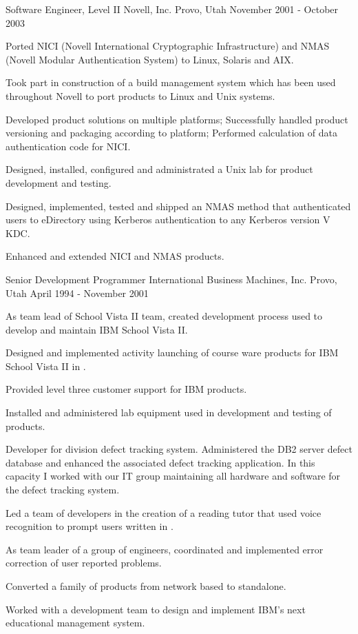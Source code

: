\cventry
{Software Engineer, Level II} %
{Novell, Inc.} %
{Provo, Utah} %
{November 2001 - October 2003} %
{
	\begin{cvitems} %
		\item {Ported NICI (Novell International Cryptographic Infrastructure) and NMAS (Novell Modular Authentication System) to Linux, Solaris and AIX.}
		\item {Took part in construction of a build management system which has been used throughout Novell to port products to Linux and Unix systems.}
		\item {Developed product solutions on multiple platforms; Successfully handled product versioning and packaging according to platform; Performed calculation of data authentication code for NICI.}
		\item {Designed, installed, configured and administrated a Unix lab for product development and testing.}
		\item {Designed, implemented, tested and shipped an NMAS method that authenticated users to eDirectory using Kerberos authentication to any Kerberos version V KDC.}
		\item {Enhanced and extended NICI and NMAS products.}
	\end{cvitems}
}

\cventry
{Senior Development Programmer} %
{International Business Machines, Inc.} %
{Provo, Utah} %
{April 1994 - November 2001} %
{
	\begin{cvitems} %
		\item {As team lead of School Vista II team, created development process used to develop and maintain IBM School Vista II.}
		\item {Designed and implemented activity launching of course ware products for IBM School Vista II in \Cpp{}.}
		\item {Provided level three customer support for IBM products.}
		\item {Installed and administered lab equipment used in development and testing of products.}
		\item {Developer for division defect tracking system. Administered the DB2 server defect database and enhanced the associated defect tracking application. In this capacity I worked with our IT group maintaining all hardware and software for the defect tracking system.}
		\item {Led a team of developers in the creation of a reading tutor that used voice recognition to prompt users written in \Cpp{}.}
		\item {As team leader of a group of engineers, coordinated and implemented error correction of user reported problems.}
		\item {Converted a family of products from network based to standalone.}
		\item {Worked with a development team to design and implement IBM's next educational management system.}
	\end{cvitems}
}
